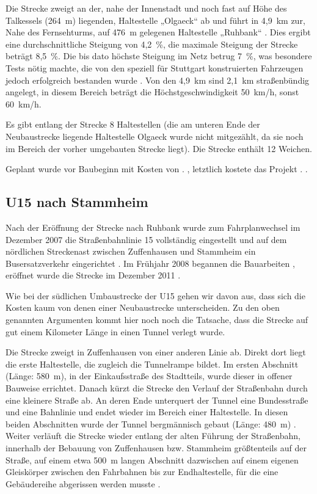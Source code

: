 Die Strecke zweigt an der, nahe der Innenstadt und noch fast auf Höhe des
Talkessels (264{\ }m) liegenden, Haltestelle „Olgaeck“ ab und führt in 4,9{\ }km
zur, Nahe des Fernsehturms, auf 476{\ }m gelegenen Haltestelle „Ruhbank“
\cite{u15vorinfo}. Dies ergibt eine durchschnittliche Steigung von 4,2{\ }\%,
die maximale Steigung der Strecke beträgt 8,5{\ }\%. Die bis dato höchste
Steigung im Netz betrug 7{\ }\%, was besondere Tests nötig machte, die von den
speziell für Stuttgart konstruierten Fahrzeugen jedoch erfolgreich bestanden
wurde \cite{u15vorinfo}. Von den 4,9{\ }km sind 2,1{\ }km straßenbündig
angelegt, in diesem Bereich beträgt die Höchstgeschwindigkeit 50{\ }km/h, sonst
60{\ }km/h.

Es gibt entlang der Strecke 8 Haltestellen \cite{u15splan} (die am unteren Ende
der Neubaustrecke liegende Haltestelle Olgaeck wurde nicht mitgezählt, da sie
noch im Bereich der vorher umgebauten Strecke liegt). Die Strecke enthält 12
Weichen.

Geplant wurde vor Baubeginn mit Kosten von . \cite{u15vorinfo},
letztlich kostete das Projekt . \cite{u15seb}.

\subsection*{U15 nach Stammheim}

Nach der Eröffnung der Strecke nach Ruhbank wurde zum Fahrplanwechsel im
Dezember 2007 die Straßenbahnlinie 15 vollständig eingestellt und auf dem
nördlichen Streckenast zwischen Zuffenhausen und Stammheim ein Busersatzverkehr
eingerichtet \cite{u15sv}.  Im Frühjahr 2008 begannen die Bauarbeiten
\cite{u15seb}, eröffnet wurde die Strecke im Dezember 2011 \cite{u15sv}.

Wie bei der südlichen Umbaustrecke der U15 gehen wir davon aus, dass sich die
Kosten kaum von denen einer Neubaustrecke unterscheiden. Zu den oben genannten
Argumenten kommt hier noch noch die Tatsache, dass die Strecke auf gut einem
Kilometer Länge in einen Tunnel verlegt wurde.

Die Strecke zweigt in Zuffenhausen von einer anderen Linie ab. Direkt dort liegt die erste Haltestelle, die zugleich die Tunnelrampe bildet. Im ersten Abschnitt (Länge: 580{\ }m), in der Einkaufsstraße des Stadtteils, wurde dieser in offener Bauweise errichtet.
Danach kürzt die Strecke den Verlauf der Straßenbahn durch eine kleinere Straße ab. An deren Ende unterquert der Tunnel eine Bundesstraße und eine Bahnlinie und endet wieder im Bereich einer Haltestelle. In diesen beiden Abschnitten wurde der Tunnel bergmännisch gebaut (Länge: 480{\ m}) \cite{u15mail} \cite{u15sv} \cite{u15nplan}.
Weiter verläuft die Strecke wieder entlang der alten Führung der Straßenbahn, innerhalb der Bebauung von Zuffenhausen bzw. Stammheim größtenteils auf der Straße, auf einem etwa 500{\ }m langen Abschnitt dazwischen auf einem eigenen Gleiskörper zwischen den Fahrbahnen \cite{u15nplan} bis zur Endhaltestelle, für die eine Gebäudereihe abgerissen werden musste \cite{u15sv}.

